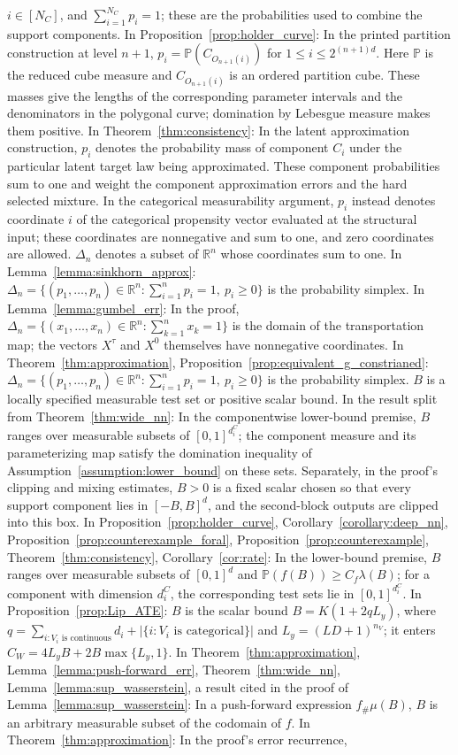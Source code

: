 \documentclass[12pt]{article}
\theoremstyle{plain}
\theoremstyle{definition}
\theoremstyle{remark}
\begin{document}
$i\in[N_C]$, and $\sum_{i=1}^{N_C}p_i=1$; these are the probabilities used to combine the support components. In Proposition~\ref{prop:holder_curve}: In the printed partition construction at level $n+1$, $p_i=\mathbb P(C_{O_{n+1}(i)})$ for $1\leqslant i\leqslant2^{(n+1)d}$. Here $\mathbb P$ is the reduced cube measure and $C_{O_{n+1}(i)}$ is an ordered partition cube. These masses give the lengths of the corresponding parameter intervals and the denominators in the polygonal curve; domination by Lebesgue measure makes them positive. In Theorem~\ref{thm:consistency}: In the latent approximation construction, $p_i$ denotes the probability mass of component $C_i$ under the particular latent target law being approximated. These component probabilities sum to one and weight the component approximation errors and the hard selected mixture. In the categorical measurability argument, $p_i$ instead denotes coordinate $i$ of the categorical propensity vector evaluated at the structural input; these coordinates are nonnegative and sum to one, and zero coordinates are allowed. $\Delta_n$ denotes a subset of $\mathbb{R}^n$ whose coordinates sum to one. In Lemma~\ref{lemma:sinkhorn_approx}: $\Delta_n=\{(p_1,\ldots,p_n)\in\mathbb{R}^n:\sum_{i=1}^n p_i=1,\ p_i\geqslant0\}$ is the probability simplex. In Lemma~\ref{lemma:gumbel_err}: In the proof, $\Delta_n=\{(x_1,\ldots,x_n)\in\mathbb{R}^n:\sum_{k=1}^n x_k=1\}$ is the domain of the transportation map; the vectors $X^\tau$ and $X^0$ themselves have nonnegative coordinates. In Theorem~\ref{thm:approximation}, Proposition~\ref{prop:equivalent_g_constrianed}: $\Delta_n=\{(p_1,\ldots,p_n)\in\mathbb R^n:\sum_{i=1}^n p_i=1,\ p_i\geqslant0\}$ is the probability simplex. $B$ is a locally specified measurable test set or positive scalar bound. In the result split from Theorem~\ref{thm:wide_nn}: In the componentwise lower-bound premise, $B$ ranges over measurable subsets of $[0,1]^{d_i^C}$; the component measure and its parameterizing map satisfy the domination inequality of Assumption~\ref{assumption:lower_bound} on these sets. Separately, in the proof's clipping and mixing estimates, $B>0$ is a fixed scalar chosen so that every support component lies in $[-B,B]^d$, and the second-block outputs are clipped into this box. In Proposition~\ref{prop:holder_curve}, Corollary~\ref{corollary:deep_nn}, Proposition~\ref{prop:counterexample_foral}, Proposition~\ref{prop:counterexample}, Theorem~\ref{thm:consistency}, Corollary~\ref{cor:rate}: In the lower-bound premise, $B$ ranges over measurable subsets of $[0,1]^d$ and $\mathbb{P}(f(B))\geqslant C_f\lambda(B)$; for a component with dimension $d_i^C$, the corresponding test sets lie in $[0,1]^{d_i^C}$. In Proposition~\ref{prop:Lip_ATE}: $B$ is the scalar bound $B=K(1+2qL_y)$, where $q=\sum_{i:V_i\text{ is continuous}}d_i+|\{i:V_i\text{ is categorical}\}|$ and $L_y=(LD+1)^{n_V}$; it enters $C_W=4L_yB+2B\max\{L_y,1\}$. In Theorem~\ref{thm:approximation}, Lemma~\ref{lemma:push-forward_err}, Theorem~\ref{thm:wide_nn}, Lemma~\ref{lemma:sup_wasserstein}, a result cited in the proof of Lemma~\ref{lemma:sup_wasserstein}: In a push-forward expression $f_\#\mu(B)$, $B$ is an arbitrary measurable subset of the codomain of $f$. In Theorem~\ref{thm:approximation}: In the proof's error recurrence, 
\end{document}
